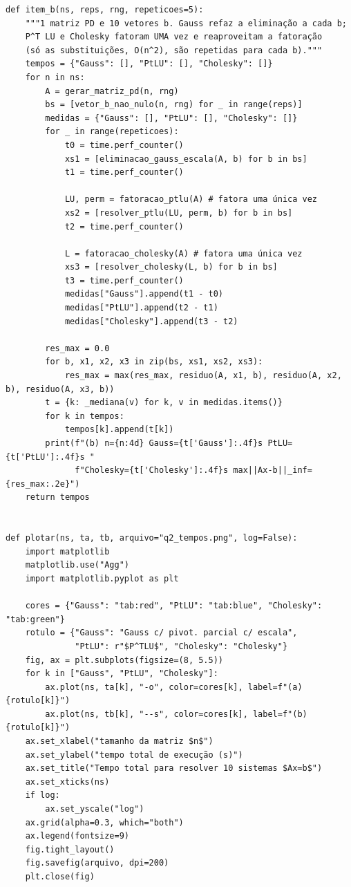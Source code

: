 \documentclass{article}
\theoremstyle{remark}
\begin{document}
\begin{lstlisting}
def item_b(ns, reps, rng, repeticoes=5):
    """1 matriz PD e 10 vetores b. Gauss refaz a eliminação a cada b;
    P^T LU e Cholesky fatoram UMA vez e reaproveitam a fatoração
    (só as substituições, O(n^2), são repetidas para cada b)."""
    tempos = {"Gauss": [], "PtLU": [], "Cholesky": []}
    for n in ns:
        A = gerar_matriz_pd(n, rng)
        bs = [vetor_b_nao_nulo(n, rng) for _ in range(reps)]
        medidas = {"Gauss": [], "PtLU": [], "Cholesky": []}
        for _ in range(repeticoes):
            t0 = time.perf_counter()
            xs1 = [eliminacao_gauss_escala(A, b) for b in bs]
            t1 = time.perf_counter()

            LU, perm = fatoracao_ptlu(A) # fatora uma única vez
            xs2 = [resolver_ptlu(LU, perm, b) for b in bs]
            t2 = time.perf_counter()

            L = fatoracao_cholesky(A) # fatora uma única vez
            xs3 = [resolver_cholesky(L, b) for b in bs]
            t3 = time.perf_counter()
            medidas["Gauss"].append(t1 - t0)
            medidas["PtLU"].append(t2 - t1)
            medidas["Cholesky"].append(t3 - t2)

        res_max = 0.0
        for b, x1, x2, x3 in zip(bs, xs1, xs2, xs3):
            res_max = max(res_max, residuo(A, x1, b), residuo(A, x2, b), residuo(A, x3, b))
        t = {k: _mediana(v) for k, v in medidas.items()}
        for k in tempos:
            tempos[k].append(t[k])
        print(f"(b) n={n:4d} Gauss={t['Gauss']:.4f}s PtLU={t['PtLU']:.4f}s "
              f"Cholesky={t['Cholesky']:.4f}s max||Ax-b||_inf={res_max:.2e}")
    return tempos


def plotar(ns, ta, tb, arquivo="q2_tempos.png", log=False):
    import matplotlib
    matplotlib.use("Agg")
    import matplotlib.pyplot as plt

    cores = {"Gauss": "tab:red", "PtLU": "tab:blue", "Cholesky": "tab:green"}
    rotulo = {"Gauss": "Gauss c/ pivot. parcial c/ escala",
              "PtLU": r"$P^TLU$", "Cholesky": "Cholesky"}
    fig, ax = plt.subplots(figsize=(8, 5.5))
    for k in ["Gauss", "PtLU", "Cholesky"]:
        ax.plot(ns, ta[k], "-o", color=cores[k], label=f"(a) {rotulo[k]}")
        ax.plot(ns, tb[k], "--s", color=cores[k], label=f"(b) {rotulo[k]}")
    ax.set_xlabel("tamanho da matriz $n$")
    ax.set_ylabel("tempo total de execução (s)")
    ax.set_title("Tempo total para resolver 10 sistemas $Ax=b$")
    ax.set_xticks(ns)
    if log:
        ax.set_yscale("log")
    ax.grid(alpha=0.3, which="both")
    ax.legend(fontsize=9)
    fig.tight_layout()
    fig.savefig(arquivo, dpi=200)
    plt.close(fig)



\end{lstlisting}
\end{document}
